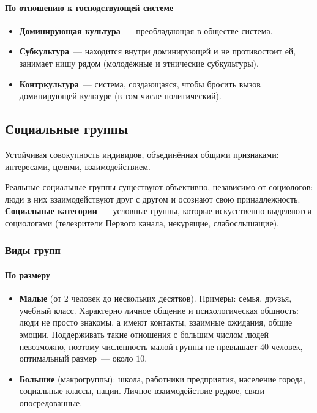 \documentclass[12pt]{article}
\begin{document}
	\paragraph{По отношению к господствующей системе}
	\begin{itemize}
		\item \textbf{Доминирующая культура}~--- преобладающая в обществе система.
		\item \textbf{Субкультура}~--- находится внутри доминирующей и не противостоит ей, занимает нишу рядом (молодёжные и этнические субкультуры).
		\item \textbf{Контркультура}~--- система, создающаяся, чтобы бросить вызов доминирующей культуре (в том числе политический).
	\end{itemize}

	\subsection{Социальные группы}

	\begin{definition}
		Устойчивая совокупность индивидов, объединённая общими признаками: интересами, целями, взаимодействием.
	\end{definition}

	\begin{note}
		Реальные социальные группы существуют объективно, независимо от социологов: люди в них взаимодействуют друг с другом и осознают свою принадлежность. \textbf{Социальные категории}~--- условные группы, которые искусственно выделяются социологами (телезрители Первого канала, некурящие, слабослышащие).
	\end{note}

	\subsubsection{Виды групп}

	\paragraph{По размеру}
	\begin{itemize}
		\item \textbf{Малые} (от $2$ человек до нескольких десятков). Примеры: семья, друзья, учебный класс. Характерно личное общение и психологическая общность: люди не просто знакомы, а имеют контакты, взаимные ожидания, общие эмоции. Поддерживать такие отношения с большим числом людей невозможно, поэтому численность малой группы не превышает $40$ человек, оптимальный размер~--- около $10$.
		\item \textbf{Большие} (макрогруппы): школа, работники предприятия, население города, социальные классы, нации. Личное взаимодействие редкое, связи опосредованные.
	\end{itemize}
\end{document}
